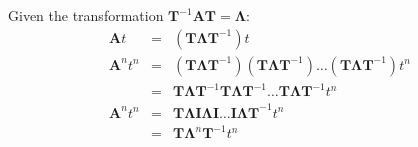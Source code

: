 Given the transformation $\mathbf{T}^{-1}\mathbf{AT}=\mathbf{\Lambda}$:
\begin{eqnarray*}
	\mathbf{A}t & = & (\mathbf{T\Lambda T}^{-1}) t \\
	\mathbf{A}^nt^n & = & (\mathbf{T\Lambda T}^{-1})(\mathbf{T\Lambda T}^{-1})\ldots(\mathbf{T\Lambda T}^{-1})t^n \\
	                & = & \mathbf{T\Lambda T}^{-1}\mathbf{T\Lambda T}^{-1}\ldots\mathbf{T\Lambda T}^{-1}t^n \\
	\mathbf{A}^nt^n & = & \mathbf{T\Lambda}\mathbf{I}\mathbf{\Lambda I}\ldots\mathbf{I\Lambda T}^{-1}t^n \\
	\               & = & \mathbf{T\Lambda}^n\mathbf{T}^{-1}t^n \\
\end{eqnarray*}
\endinput

